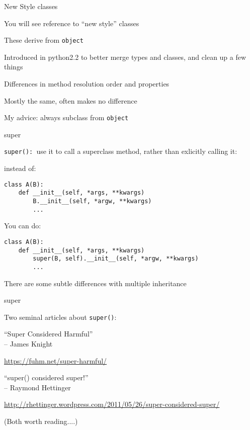 \documentclass{beamer}
\begin{document}
\begin{frame}[fragile]{New Style classes}

{\Large You will see reference to ``new style'' classes}

\vfill
{\Large These derive from \verb|object|}

\vfill
{\Large Introduced in python2.2 to better merge types and classes, and clean up a few things}

\vfill
{\Large Differences in method resolution order and properties}

\vfill
{\Large Mostly the same, often makes no difference}

\vfill
{\Large My advice: always subclass from \verb|object|}

\end{frame}

\begin{frame}[fragile]{super}

{\Large \verb|super(): |use it to call a superclass method, rather than exlicitly calling it:}

\vfill
{\large instead of:}
\begin{verbatim}
class A(B):
    def __init__(self, *args, **kwargs)
        B.__init__(self, *argw, **kwargs)
        ...
\end{verbatim}

{\large You can do:}
\begin{verbatim}
class A(B):
    def __init__(self, *args, **kwargs)
        super(B, self).__init__(self, *argw, **kwargs)
        ...
\end{verbatim}

\vfill
{\Large There are some subtle differences with multiple inheritance}

\end{frame}

\begin{frame}[fragile]{super}

{\Large Two seminal articles about \verb|super()|:}

\vfill
{\LARGE ``Super Considered Harmful''}\\[0.1in]
{\Large \hspace{0.5in}-- James Knight }

\vfill
\url{https://fuhm.net/super-harmful/}

\vfill
{\LARGE ``super() considered super!''}\\[0.1in]
{\Large  \hspace{0.5in}--  Raymond Hettinger }

\vfill
\url{http://rhettinger.wordpress.com/2011/05/26/super-considered-super/}
\vfill

{\large (Both worth reading....)}
\end{frame} 
\end{document}

